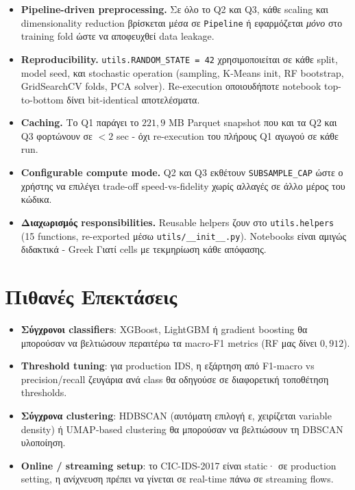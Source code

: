 \documentclass[12pt,a4paper,twoside]{book}
\begin{document}
\begin{itemize}
    \item \textbf{Pipeline-driven preprocessing.} Σε όλο το Q2 και Q3,
    κάθε scaling και dimensionality reduction βρίσκεται μέσα σε
    \texttt{Pipeline} ή εφαρμόζεται \emph{μόνο} στο training fold ώστε
    να αποφευχθεί data leakage.
    \item \textbf{Reproducibility.} \texttt{utils.RANDOM\_STATE = 42}
    χρησιμοποιείται σε κάθε split, model seed, και stochastic operation
    (sampling, K-Means init, RF bootstrap, GridSearchCV folds, PCA solver).
    Re-execution οποιουδήποτε notebook top-to-bottom δίνει bit-identical
    αποτελέσματα.
    \item \textbf{Caching.} Το Q1 παράγει το \(221{,}9\) MB Parquet
    snapshot που και τα Q2 και Q3 φορτώνουν σε \(<2\) sec - όχι
    re-execution του πλήρους Q1 αγωγού σε κάθε run.
    \item \textbf{Configurable compute mode.} Q2 και Q3 εκθέτουν
    \texttt{SUBSAMPLE\_CAP} ώστε ο χρήστης να επιλέγει trade-off
    speed-vs-fidelity χωρίς αλλαγές σε άλλο μέρος του κώδικα.
    \item \textbf{Διαχωρισμός responsibilities.} Reusable helpers ζουν
    στο \texttt{utils.helpers} (15 functions, re-exported μέσω
    \texttt{utils/\_\_init\_\_.py}). Notebooks είναι αμιγώς διδακτικά -
    Greek \og Γιατί\fg{} cells με τεκμηρίωση κάθε απόφασης.
\end{itemize}

\section{Πιθανές Επεκτάσεις}

\begin{itemize}
    \item \textbf{Σύγχρονοι classifiers}: XGBoost, LightGBM ή gradient
    boosting θα μπορούσαν να βελτιώσουν περαιτέρω τα macro-F1 metrics
    (RF μας δίνει \(0{,}912\)).
    \item \textbf{Threshold tuning}: για production IDS, η εξάρτηση από
    F1-macro vs precision/recall ζευγάρια ανά class θα οδηγούσε σε
    διαφορετική τοποθέτηση thresholds.
    \item \textbf{Σύγχρονα clustering}: HDBSCAN (αυτόματη επιλογή ε,
    χειρίζεται variable density) ή UMAP-based clustering θα μπορούσαν
    να βελτιώσουν τη DBSCAN υλοποίηση.
    \item \textbf{Online / streaming setup}: το CIC-IDS-2017 είναι
    static· σε production setting, η ανίχνευση πρέπει να γίνεται σε
    real-time πάνω σε streaming flows.
\end{itemize}
\end{document}
